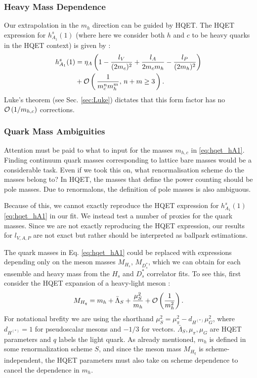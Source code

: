 \subsubsection{Heavy Mass Dependence}
\label{sec:BsDsstar_heavymass}

Our extrapolation in the $m_h$ direction can be guided by HQET. The HQET expression for $h^s_{A_1}(1)$ (where here we consider both $h$ and $c$ to be heavy quarks in the HQET context) is given by \cite{Falk:1992wt,Mannel:1994kv}:
\begin{align}
  \label{eq:hqet_hA1}
  h^s_{A_1}(1) &= \eta_A \left( 1 - {l_V\over (2m_c)^2} + {l_A \over 2 m_c m_h} - { l_P \over (2m_h)^2 } \right)  \\ \nonumber &+ \mathcal{O}\left( \, {1\over m_c^n m_h^m}, \, n+m\geq 3 \, \right).
\end{align}
Luke's theorem (see Sec. \ref{sec:Luke}) dictates that this form factor has no $\mathcal{O}\left( 1/m_{h,c} \right)$ corrections.

\subsubsection{Quark Mass Ambiguities}
\label{sec:massambiguities}

Attention must be paid to what to input for the masses $m_{h,c}$ in \eqref{eq:hqet_hA1}. Finding continuum quark masses corresponding to lattice bare masses would be a considerable task. Even if we took this on, what renormalisation scheme do the masses belong to? In HQET, the masses that define the power counting should be pole masses. Due to renormalons, the definition of pole masses is also ambiguous.

Because of this, we cannot exactly reproduce the HQET expression for $h_{A_1}^s(1)$ \eqref{eq:hqet_hA1} in our fit. We instead test a number of proxies for the quark masses. Since we are not exactly reproducing the HQET expression, our results for $l_{V,A,P}$ are not exact but rather should be interpreted as ballpark estimations.

The quark masses in Eq. \eqref{eq:hqet_hA1} could be replaced with expressions depending only on the meson masses $M_{H_s}$, $M_{D_s^*}$, which we can obtain for each ensemble and heavy mass from the $H_s$ and $D_s^*$ correlator fits. To see this, first consider the HQET expansion of a heavy-light meson \cite{Bazavov:2018omf}:
\begin{align}
  \label{eq:hqet_mass}
  M_{H_q} = m_{h} + \bar{\Lambda}_S + { \mu^2_S \over m_{h}} + \mathcal{O}\left({1\over m_h^2}\right).
\end{align}
For notational brefity we are using the shorthand $\mu_S^2 = \mu^2_{\pi} - d_{H^{(*)}} \mu^2_{G}$, where $d_{H^{(*)}} = 1$ for pseudoscalar mesons and $-1/3$ for vectors. $\bar{\Lambda}_S,\mu_{\pi},\mu_{G}$ are HQET parameters and $q$ labels the light quark. As already mentioned, $m_h$ is defined in some renormalization scheme $S$, and since the meson mass $M_{H_q}$ is scheme-independent, the HQET parameters must also take on scheme dependence to cancel the dependence in $m_h$.

